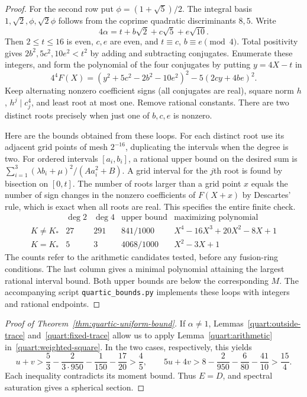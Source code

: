 \documentclass[11pt,a4paper]{article}
\theoremstyle{definition}\newtheorem{definition}[theorem]{Definition}
\theoremstyle{remark}\newtheorem{remark}[theorem]{Remark}
\numberwithin{equation}{section}
\begin{document}
\begin{proof}
For the second row put $\phi=(1+\sqrt5)/2$.
The integral basis $1,\sqrt2,\phi,\sqrt2\phi$ follows from the
coprime quadratic discriminants $8,5$. Write
\[
 4\alpha=t+b\sqrt2+c\sqrt5+e\sqrt{10}.
\]
Then $2\le t\le16$ is even, $c,e$ are even, and
$t\equiv c$, $b\equiv e\pmod4$. Total positivity gives
$2b^2,5c^2,10e^2<t^2$ by adding and subtracting conjugates.
Enumerate these integers, and form the polynomial of the four conjugates
by putting $y=4X-t$ in
\[
 4^4F(X)=(y^2+5c^2-2b^2-10e^2)^2-5(2cy+4be)^2.
\]
Keep alternating nonzero coefficient signs (all conjugates are real),
square norm $h$, $h^j\mid c_j^4$, and least root at most one.
Remove rational constants. There are two distinct roots precisely
when just one of $b,c,e$ is nonzero.

Here are the bounds obtained from these loops. For each distinct root
use its adjacent grid points of mesh $2^{-16}$, duplicating the
intervals when the degree is two. For ordered intervals $[a_i,b_i]$,
a rational upper bound on the desired sum is
$\sum_{i=1}^3(\lambda b_i+\mu)^2/(Aa_i^2+B)$. A grid interval for the
$j$th root is found by bisection on $[0,t]$. The number of roots
larger than a grid point $x$ equals the number of sign changes in the
nonzero coefficients of $F(X+x)$ by Descartes' rule, which is exact
when all roots are real. This specifies the entire finite check.
\[
\begin{array}{c|rr|c|l}
 &\deg2&\deg4&\text{upper bound}&
 \text{maximizing polynomial}\\\hline
 K\ne K_*&27&291&841/1000&X^4-16X^3+20X^2-8X+1\\
 K=K_*&5&3&4068/1000&X^2-3X+1
\end{array}
\]
The counts refer to the arithmetic candidates tested, before any
fusion-ring conditions. The last column gives a minimal polynomial attaining the largest rational interval bound. Both upper bounds are below the corresponding
$M$. The accompanying script \texttt{quartic\_bounds.py} implements
these loops with integers and rational endpoints.
\end{proof}

\begin{proof}[Proof of Theorem~\ref{thm:quartic-uniform-bound}]
If $\alpha\ne1$, Lemmas~\ref{quart:outside-trace}
and~\ref{quart:fixed-trace} allow us to apply
Lemma~\ref{quart:arithmetic} in~\eqref{quart:weighted-square}.
In the two cases, respectively, this yields
\[
 u+v>\frac53-\frac2{3\cdot950}-\frac1{150}-\frac{17}{20}>\frac45,
 \qquad
 5u+4v>8-\frac2{950}-\frac6{80}-\frac{41}{10}>\frac{15}4.
\]
Each inequality contradicts its moment bound. Thus $E=D$, and
spectral saturation gives a spherical section.
\end{proof}
\end{document}
